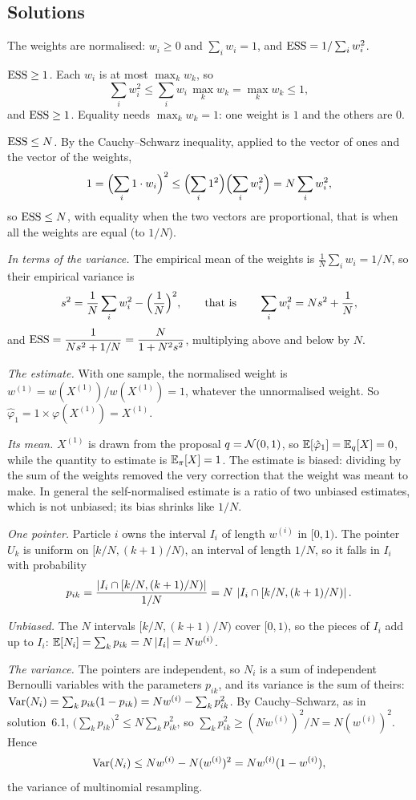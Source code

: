 \subsection*{Solutions}

 The weights are normalised: $w_i\ge0$ and $\sum_iw_i=1$, and
$\operatorname{ESS}=1/\sum_iw_i^2$.

\emph{$\operatorname{ESS}\ge1$.} Each $w_i$ is at most $\max_kw_k$, so
\[
  \sum_iw_i^2\le\sum_iw_i\,\max_kw_k=\max_kw_k\le1 ,
\]
and $\operatorname{ESS}\ge1$. Equality needs $\max_kw_k=1$: one weight is $1$ and the
others are $0$.

\emph{$\operatorname{ESS}\le N$.} By the Cauchy--Schwarz inequality, applied to
the vector of ones and the vector of the weights,
\[
  1=\Bigl(\sum_i1\cdot w_i\Bigr)^2\le\Bigl(\sum_i1^2\Bigr)
  \Bigl(\sum_iw_i^2\Bigr)=N\sum_iw_i^2 ,
\]
so $\operatorname{ESS}\le N$, with equality when the two vectors are proportional, that
is when all the weights are equal (to $1/N$).

\emph{In terms of the variance.} The empirical mean of the weights is
$\frac1N\sum_iw_i=1/N$, so their empirical variance is
\[
  s^2=\frac1N\sum_iw_i^2-\Bigl(\frac1N\Bigr)^2,\qquad\text{that is}\qquad
  \sum_iw_i^2=Ns^2+\frac1N ,
\]
and $\operatorname{ESS}=\dfrac{1}{Ns^2+1/N}=\dfrac{N}{1+N^2s^2}$, multiplying above and
below by $N$.

 \emph{The estimate.} With one sample, the normalised weight
is $w^{(1)}=w(X^{(1)})/w(X^{(1)})=1$, whatever the unnormalised weight.
So $\hat\varphi_1=1\times\varphi(X^{(1)})=X^{(1)}$.

\emph{Its mean.} $X^{(1)}$ is drawn from the proposal $q=\mathcal{N}(0,1)$,
so $\mathbb{E}[\hat\varphi_1]=\mathbb{E}_q[X]=0$, while the quantity to estimate is
$\mathbb{E}_\pi[X]=1$. The estimate is biased: dividing by the sum of the weights
removed the very correction that the weight was meant to make. In general
the self-normalised estimate is a ratio of two unbiased estimates, which
is not unbiased; its bias shrinks like $1/N$.

 \emph{One pointer.} Particle $i$ owns the interval $I_i$ of
length $w^{(i)}$ in $[0,1)$. The pointer $U_k$ is uniform on
$[k/N,(k+1)/N)$, an interval of length $1/N$, so it falls in $I_i$ with
probability
\[
  p_{ik}=\frac{\left\lvert I_i\cap[k/N,(k+1)/N)\right\rvert}{1/N}
  =N\,\left\lvert I_i\cap[k/N,(k+1)/N)\right\rvert .
\]

\emph{Unbiased.} The $N$ intervals $[k/N,(k+1)/N)$ cover $[0,1)$, so the
pieces of $I_i$ add up to $I_i$:
$\mathbb{E}[N_i]=\sum_kp_{ik}=N\left\lvert I_i\right\rvert=Nw^{(i)}$.

\emph{The variance.} The pointers are independent, so $N_i$ is a sum of
independent Bernoulli variables with the parameters $p_{ik}$, and its
variance is the sum of theirs:
$\operatorname{Var}(N_i)=\sum_kp_{ik}(1-p_{ik})=Nw^{(i)}-\sum_kp_{ik}^2$. By
Cauchy--Schwarz, as in solution~6.1,
$\bigl(\sum_kp_{ik}\bigr)^2\le N\sum_kp_{ik}^2$, so
$\sum_kp_{ik}^2\ge(Nw^{(i)})^2/N=N(w^{(i)})^2$. Hence
\[
  \operatorname{Var}(N_i)\le Nw^{(i)}-N(w^{(i)})^2=Nw^{(i)}(1-w^{(i)}),
\]
the variance of multinomial resampling.

